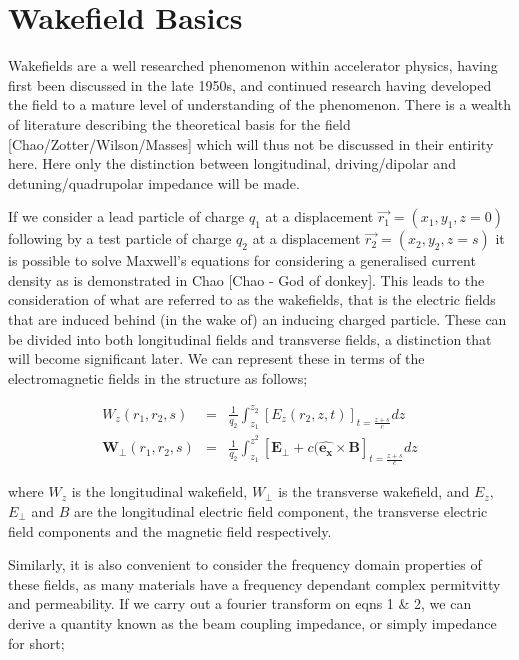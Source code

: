 \section{Wakefield Basics}

Wakefields are a well researched phenomenon within accelerator physics, having first been discussed in the late 1950s, and continued research having developed the field to a mature level of understanding of the phenomenon. There is a wealth of literature describing the theoretical basis for the field [Chao/Zotter/Wilson/Masses] which will thus not be discussed in their entirity here. Here only the distinction between longitudinal, driving/dipolar and detuning/quadrupolar impedance will be made.

If we consider a lead particle of charge $q_{1}$ at a displacement $\vec{r_{1}} = (x_{1}, y_{1}, z = 0)$ following by a test particle of charge $q_{2}$ at a displacement $\vec{r_{2}} = (x_{2}, y_{2}, z = s)$ it is possible to solve Maxwell's equations for considering a generalised current density as is demonstrated in Chao [Chao - God of donkey]. This leads to the consideration of what are referred to as the wakefields, that is the electric fields that are induced behind (in the wake of) an inducing charged particle. These can be divided into both longitudinal fields and transverse fields, a distinction that will become significant later. We can represent these in terms of the electromagnetic fields in the structure as follows;

\begin{eqnarray}
W_{z}(r_{1},r_{2},s) & = & \frac{1}{q_{2}} \int_{z_{1}}^{z_{2}} [E_{z}(r_{2},z,t)]_{t=\frac{z+s}{c}}dz \\
\mathbf{W_{\perp}}(r_{1},r_{2},s) & = &\frac{1}{q_{2}} \int_{z_{1}}^{z^{2}} [\mathbf{E_{\perp}} + c(\hat{\mathbf{e_{x}}}  \times{}\mathbf{B}]_{t=\frac{z+s}{c}}dz
\label{eqn:wakefield-lorentz-trans}
\end{eqnarray}

where $W_{z}$ is the longitudinal wakefield, $W_{\perp}$ is the transverse wakefield, and $E_{z}$, $E_{\perp}$ and $B$ are the longitudinal electric field component, the transverse electric field components and the magnetic field respectively. 

Similarly, it is also convenient to consider the frequency domain properties of these fields, as many materials have a frequency dependant complex permitvitty and permeability. If we carry out a fourier transform on eqns 1 \& 2, we can derive a quantity known as the beam coupling impedance, or simply impedance for short;

